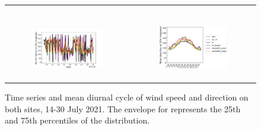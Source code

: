 \begin{figure}[hbtp]
\begin{tabular}{cc}
\begin{subfigure}[t]{0.5\textwidth}
        \end{subfigure} \\
        \begin{subfigure}[t]{0.5\textwidth}
            \caption{}
            \includegraphics[width=\textwidth]{images/chap5/SOP_TS_DC/time_series_elsplans_wind_direction_10m.png}
        \end{subfigure} &
        \begin{subfigure}[t]{0.5\textwidth}
            \caption{}
            \includegraphics[width=\textwidth]{images/chap5/SOP_TS_DC/diurnal_cycle_elsplans_wind_direction_10m.png}
        \end{subfigure}
    \end{tabular}
    \caption{Time series and mean diurnal cycle of wind speed and direction on both sites, 14-30 July 2021. The envelope for \mesomean represents the 25th and 75th percentiles of the distribution.}
    \label{fig:bothsites_wind}
\end{figure}

\hfill

